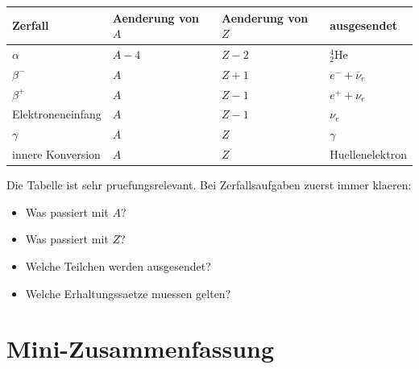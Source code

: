 \begin{center}
\begin{tabular}{|l|l|l|l|}
\hline
Zerfall & Aenderung von $A$ & Aenderung von $Z$ & ausgesendet \\
\hline
$\alpha$ & $A-4$ & $Z-2$ & ${}^{4}_{2}\mathrm{He}$ \\
\hline
$\beta^-$ & $A$ & $Z+1$ & $e^-+\overline{\nu}_e$ \\
\hline
$\beta^+$ & $A$ & $Z-1$ & $e^+ + \nu_e$ \\
\hline
Elektroneneinfang & $A$ & $Z-1$ & $\nu_e$ \\
\hline
$\gamma$ & $A$ & $Z$ & $\gamma$ \\
\hline
innere Konversion & $A$ & $Z$ & Huellenelektron \\
\hline
\end{tabular}
\end{center}

\begin{examtipbox}
Die Tabelle ist sehr pruefungsrelevant.
Bei Zerfallsaufgaben zuerst immer klaeren:
\begin{itemize}
    \item Was passiert mit $A$?
    \item Was passiert mit $Z$?
    \item Welche Teilchen werden ausgesendet?
    \item Welche Erhaltungssaetze muessen gelten?
\end{itemize}
\end{examtipbox}

\section{Mini-Zusammenfassung}

